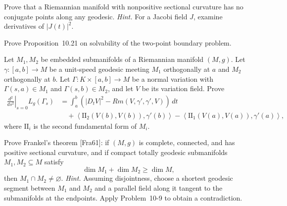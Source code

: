 \begin{exercise}
\label{prob:nonpositive-curvature-conjugate-points}

Prove that a Riemannian manifold with nonpositive sectional curvature has no
conjugate points along any geodesic. \emph{Hint.} For a Jacobi field $J$,
examine derivatives of $|J(t)|^2$.
\end{exercise}

\begin{exercise}
\label{prob:two-point-boundary-problem}

Prove Proposition~10.21 on solvability of the two-point boundary problem.
\end{exercise}

\begin{exercise}
\label{prob:normal-variation-submanifolds}

Let $M_1,M_2$ be embedded submanifolds of a Riemannian manifold $(M,g)$.
Let $\gamma:[a,b]\to M$ be a unit-speed geodesic meeting $M_1$ orthogonally
at $a$ and $M_2$ orthogonally at $b$. Let
$\Gamma:K\times[a,b]\to M$ be a normal variation with
$\Gamma(s,a)\in M_1$ and $\Gamma(s,b)\in M_2$, and let $V$ be its variation
field. Prove
\[
\begin{aligned}
\left.\frac{d^2}{ds^2}\right|_{s=0}L_g(\Gamma_s)
&=\int_a^b
\left(
|D_tV|^2-Rm(V,\gamma',\gamma',V)
\right)\,dt\\
&\quad+\left\langle
\mathrm{II}_2(V(b),V(b)),\gamma'(b)
\right\rangle
-\left\langle
\mathrm{II}_1(V(a),V(a)),\gamma'(a)
\right\rangle,
\end{aligned}
\]
where $\mathrm{II}_i$ is the second fundamental form of $M_i$.
\end{exercise}

\begin{exercise}
\label{prob:frankel-geodesic-intersection}

Prove Frankel's theorem [Fra61]: if $(M,g)$ is complete, connected, and has
positive sectional curvature, and if compact totally geodesic submanifolds
$M_1,M_2\subseteq M$ satisfy
\[
\dim M_1+\dim M_2\geq\dim M,
\]
then $M_1\cap M_2\neq\varnothing$.
\emph{Hint.} Assuming disjointness, choose a shortest geodesic segment between
$M_1$ and $M_2$ and a parallel field along it tangent to the submanifolds at
the endpoints. Apply Problem~10-9 to obtain a contradiction.
\end{exercise}

